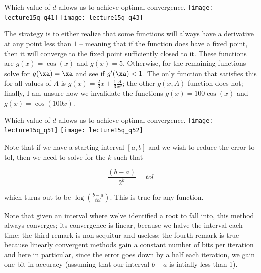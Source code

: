 \documentclass[../main.tex]{subfiles}
\begin{document}
    Which value of $d$ allows us to achieve optimal convergence.
    \texttt{[image: lecture15q\_q41]}
    \texttt{[image: lecture15q\_q43]}
    \begin{solution}
        The strategy is to either realize that some functions will always have a derivative at any point less than $1$ -- meaning that if the function does have a fixed point, then it will converge to the fixed point sufficiently closed to it. These functions are $g(x) = \cos(x)$ and $g(x) = 5$. Otherwise, for the remaining functions solve for $g(\xa) = \xa$ and see if $g'(\xa) < 1$. The only function that satisfies this for all values of $A$ is $g(x) = \frac{2}{3}x + \frac{1}{3}\frac{A}{x^2}$; the other $g(x,A)$ function does not; finally, I am unsure how we invalidate the functions $g(x) = 100 \cos(x)$ and $g(x) = \cos(100 x)$.
    \end{solution}

    Which value of $d$ allows us to achieve optimal convergence.
    \texttt{[image: lecture15q\_q51]}
    \texttt{[image: lecture15q\_q52]}
    \begin{solution}
        Note that if we have a starting interval $[a,b]$ and we wish to reduce the error to tol, then we need to solve for the $k$ such that

        \[
            \frac{(b-a)}{2^k} = tol
        \]

        which turns out to be $\log(\frac{b-a}{tol}).$ This is true for any function.

        Note that given an interval where we've identified a root to fall into, this method always converges; its convergence is linear, because we halve the interval each time; the third remark is non-sequitur and useless; the fourth remark is true because linearly convergent methods gain a constant number of bits per iteration and here in particular, since the error goes down by a half each iteration, we gain one bit in accuracy (assuming that our interval $b-a$ is intially less than 1).
    \end{solution}
\end{document}
